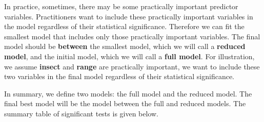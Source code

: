 \documentclass[
]{book}
\newenvironment{Shaded}{\begin{snugshade}}{\end{snugshade}}
\newcommand{\AttributeTok}[1]{\textcolor[rgb]{0.13,0.29,0.53}{#1}}
\newcommand{\CommentTok}[1]{\textcolor[rgb]{0.56,0.35,0.01}{\textit{#1}}}
\newcommand{\DecValTok}[1]{\textcolor[rgb]{0.00,0.00,0.81}{#1}}
\newcommand{\FunctionTok}[1]{\textcolor[rgb]{0.13,0.29,0.53}{\textbf{#1}}}
\newcommand{\NormalTok}[1]{#1}
\newcommand{\OtherTok}[1]{\textcolor[rgb]{0.56,0.35,0.01}{#1}}
\newcommand{\SpecialCharTok}[1]{\textcolor[rgb]{0.81,0.36,0.00}{\textbf{#1}}}
\newcommand{\StringTok}[1]{\textcolor[rgb]{0.31,0.60,0.02}{#1}}
\begin{document}
In practice, sometimes, there may be some practically important predictor variables. Practitioners want to include these practically important variables in the model regardless of their statistical significance. Therefore we can fit the smallest model that includes only those practically important variables. The final model should be \textbf{between} the smallest model, which we will call a \textbf{reduced model}, and the initial model, which we will call a \textbf{full model}. For illustration, we assume \textbf{insect} and \textbf{range} are practically important, we want to include these two variables in the final model regardless of their statistical significance.

In summary, we define two models: the full model and the reduced model. The final best model will be the model between the full and reduced models. The summary table of significant tests is given below.

\begin{Shaded}
\end{Shaded}
\end{document}
